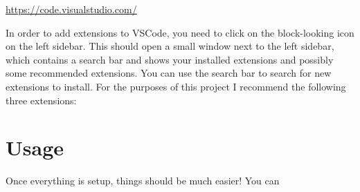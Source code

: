 \documentclass[a4paper,10pt]{article}
\begin{document}
\url{https://code.visualstudio.com/}


In order to add extensions to VSCode, you need to click on the block-looking icon on the left sidebar. This should open a small window next to the left sidebar, which contains a search bar and shows your installed extensions and possibly some recommended extensions. You can use the search bar to search for new extensions to install. For the purposes of this project I recommend the following three extensions:





\section{Usage}

Once everything is setup, things should be much easier! You can 
\end{document}
